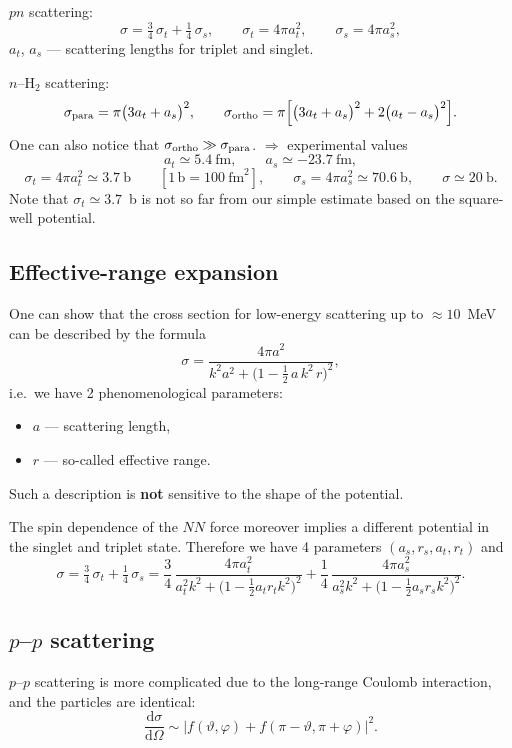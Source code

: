 \documentclass[11pt,a4paper]{article}
\newcommand{\ud}{\mathrm{d}}
\begin{document}
$pn$ scattering:
\[
\sigma=\tfrac34\,\sigma_t+\tfrac14\,\sigma_s,\qquad
\sigma_t=4\pi a_t^2,\qquad \sigma_s=4\pi a_s^2,
\]
$a_t$, $a_s$ --- scattering lengths for triplet and singlet.

$n$--H$_2$ scattering:
\[
\sigma_{\rm para}=\pi\big(3a_t+a_s\big)^2,\qquad
\sigma_{\rm ortho}=\pi\Big[\big(3a_t+a_s\big)^2+2\big(a_t-a_s\big)^2\Big].
\]
One can also notice that $\sigma_{\rm ortho}\gg\sigma_{\rm para}$.
$\Rightarrow$ experimental values
\[
a_t\simeq5.4\ \text{fm},\qquad a_s\simeq-23.7\ \text{fm},
\]
\[
\sigma_t=4\pi a_t^2\simeq3.7\ \text{b}\qquad[1\,\text{b}=100\ \text{fm}^2],
\qquad
\sigma_s=4\pi a_s^2\simeq70.6\ \text{b},
\qquad
\sigma\simeq20\ \text{b}.
\]
Note that $\sigma_t\simeq3.7$~b is not so far from our simple estimate based on
the square-well potential.

\subsection{Effective-range expansion}

One can show that the cross section for low-energy scattering up to
$\approx10$~MeV can be described by the formula
\[
\sigma=\frac{4\pi a^2}{k^2a^2+\big(1-\tfrac12\,a\,k^2\,r\big)^2},
\]
i.e.\ we have 2 phenomenological parameters:
\begin{itemize}
\item $a$ --- scattering length,
\item $r$ --- so-called effective range.
\end{itemize}
Such a description is \textbf{not} sensitive to the shape of the potential.

The spin dependence of the $NN$ force moreover implies a different potential in
the singlet and triplet state. Therefore we have 4 parameters
$(a_s,r_s,a_t,r_t)$ and
\[
\sigma=\tfrac34\,\sigma_t+\tfrac14\,\sigma_s
=\frac34\,\frac{4\pi a_t^2}{a_t^2k^2+\big(1-\tfrac12a_tr_tk^2\big)^2}
+\frac14\,\frac{4\pi a_s^2}{a_s^2k^2+\big(1-\tfrac12a_sr_sk^2\big)^2}.
\]

\subsection{\texorpdfstring{$p$--$p$}{p-p} scattering}

$p$--$p$ scattering is more complicated due to the long-range Coulomb
interaction, and the particles are identical:
\[
\frac{\ud\sigma}{\ud\Omega}\sim\big|f(\vartheta,\varphi)+f(\pi-\vartheta,\pi+\varphi)\big|^2 .
\]
\end{document}
